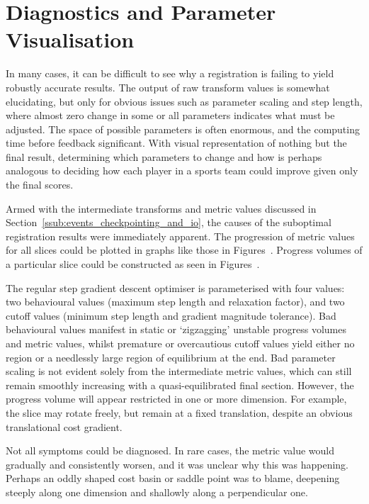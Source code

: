 
\section{Diagnostics and Parameter Visualisation} %
\label{sec:diagnostics_and_parameter_visualisation}
  In many cases, it can be difficult to see why a registration is failing to yield robustly accurate results. The output of raw transform values is somewhat elucidating, but only for obvious issues such as parameter scaling and step length, where almost zero change in some or all parameters indicates what must be adjusted. The space of possible parameters is often enormous, and the computing time before feedback significant. With visual representation of nothing but the final result, determining which parameters to change and how is perhaps analogous to deciding how each player in a sports team could improve given only the final scores.
  
  Armed with the intermediate transforms and metric values discussed in Section~\ref{ssub:events_checkpointing_and_io}, the causes of the suboptimal registration results were immediately apparent. The progression of metric values for all slices could be plotted in graphs like those in Figures~. Progress volumes of a particular slice could be constructed as seen in Figures~.
	
	The regular step gradient descent optimiser is parameterised with four values: two behavioural values (maximum step length and relaxation factor), and two cutoff values (minimum step length and gradient magnitude tolerance). Bad behavioural values manifest in static or `zigzagging' unstable progress volumes and metric values, whilst premature or overcautious cutoff values yield either no region or a needlessly large region of equilibrium at the end. Bad parameter scaling is not evident solely from the intermediate metric values, which can still remain smoothly increasing with a quasi-equilibrated final section. However, the progress volume will appear restricted in one or more dimension. For example, the slice may rotate freely, but remain at a fixed translation, despite an obvious translational cost gradient.
	
	Not all symptoms could be diagnosed. In rare cases, the metric value would gradually and consistently worsen, and it was unclear why this was happening. Perhaps an oddly shaped cost basin or saddle point was to blame, deepening steeply along one dimension and shallowly along a perpendicular one.
  
